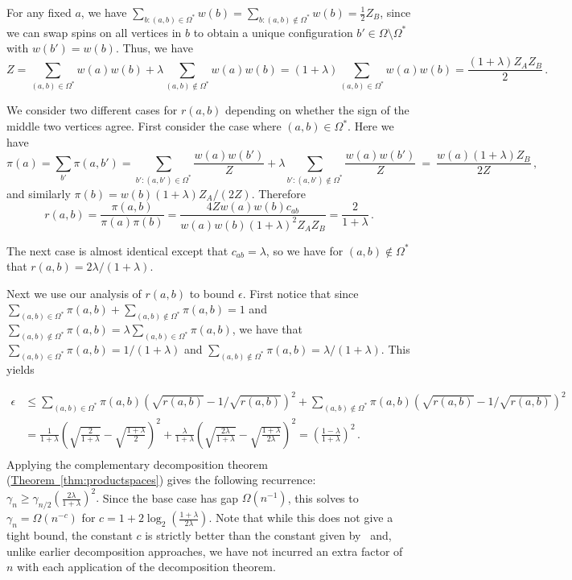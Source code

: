 \documentclass[11pt]{article}
\providecommand{\expref}[2]{\texorpdfstring{\hyperref[#2]{#1~\ref{#2}}}{#1~\ref{#2}}}
\begin{document}
For any fixed $a$, we have $\sum_{b: (a,b)\in\Omega^*} w(b) = \sum_{b:
(a,b)\notin\Omega^*} w(b)=\frac{1}{2}Z_B$, since we can swap spins 
on all vertices in $b$ to obtain a unique configuration $b'\in\Omega 
\setminus \Omega^*$ with $w(b')=w(b)$.  
Thus, we have
\[Z = \sum_{(a,b) \in \Omega^*}w(a) w(b) + \lambda \sum_{(a,b) \notin
    \Omega^*}w(a)w(b) = (1 + \lambda)\sum_{(a,b) \in \Omega^*}w(a)
  w(b) = \frac{(1+\lambda)Z_AZ_B}{2}\,.\]

We consider two different cases for $r(a,b)$ depending on
whether the sign of the middle two vertices agree.  First consider
the case where $(a,b) \in \Omega^*$. Here we have
\[\pi(a) = \sum_{b'}\pi(a,b') =\sum_{b': (a,b')\in
\Omega^*} \frac{w(a)w(b')}{Z} + \lambda \sum_{b': (a,b')\notin \Omega^*}
\frac{w(a)w(b')}{Z}~=~ \frac{w(a)(1+\lambda)Z_B}{2Z}\,,\]
and similarly $\pi(b) =w(b)(1+\lambda)Z_A/(2Z)$.  Therefore
\[r(a,b)= \frac{\pi(a,b) }{\pi(a)\pi(b)} = \frac{4Zw(a)w(b)
   c_{ab}}{w(a)w(b)(1+\lambda)^2Z_AZ_B} = \frac{2}{1+\lambda}\,.\]

\noindent The next case is almost identical except that $c_{ab} = \lambda$, 
so we have for $(a,b) \notin \Omega^*$ that $r(a,b) = 2\lambda/(1 + \lambda)$.

Next we use our analysis of $r(a,b)$ to bound $\epsilon$. First 
notice that since $\sum_{(a,b) \in \Omega^*} \pi(a,b) + \sum_{(a,b) 
\notin \Omega^*} \pi(a,b)  = 1$ and $\sum_{(a,b) \notin \Omega^*} 
\pi(a,b) = \lambda \sum_{(a,b) \in \Omega^*}\pi(a,b)$, we have that 
$\sum_{(a,b) \in \Omega^*} \pi(a,b) = 1/(1+\lambda)$ and $\sum_{(a,b) 
\notin \Omega^*} \pi(a,b)  = \lambda/(1 + \lambda)$. This yields

\begin{align*}
\epsilon &\leq
 \sum_{(a,b) \in \Omega^*} \pi(a,b)(\sqrt{r(a,b)} -1/\sqrt{r(a,b)})^2  + \sum_{(a,b) \notin \Omega^*} \pi(a,b)(\sqrt{r(a,b)} -1/\sqrt{r(a,b)})^2\\
&= \frac{1}{1+\lambda} \left(\sqrt{ \frac{2}{1+\lambda}} -\sqrt{ \frac{1+\lambda}{2}}\right)^2 + \frac{\lambda}{1+\lambda} \left(\sqrt{\frac{2\lambda}{1+\lambda}} -\sqrt{ \frac{1+\lambda}{2\lambda}}\right)^2 = \left(\frac{1-\lambda}{1+\lambda}\right)^2\,. \\
\end{align*}
%
Applying the complementary decomposition theorem (\expref{Theorem}{thm:productspaces}) 
gives the following recurrence: 
$\gamma_{n} \geq \gamma_{n/2}\left(\frac{2\lambda}{1+\lambda}\right)^2.$
Since the base case has gap $\Omega(n^{-1})$, this solves to $\gamma_n
= \Omega(n^{-c})$ for $c = 1 +
2\log_2\left(\frac{1+\lambda}{2\lambda}\right).$  Note that while this
does not give a tight bound, the constant $c$ is strictly better than
the constant given by~\cite{jstv04} and, unlike earlier
decomposition approaches, we have not incurred an extra factor of $n$
with each application of the decomposition theorem. 
\end{document}
